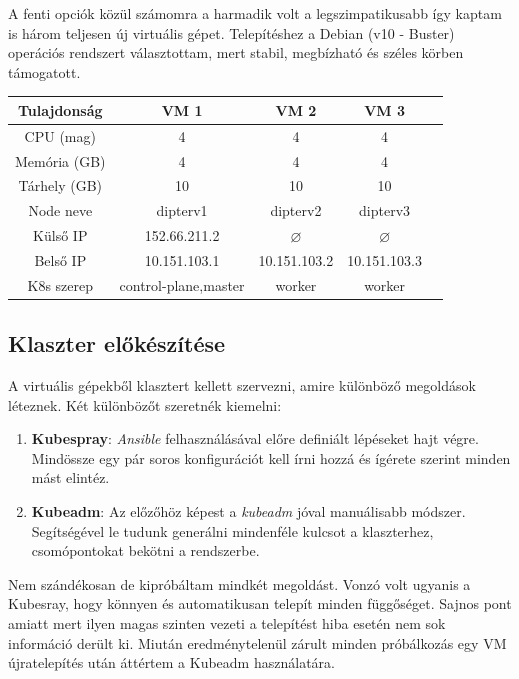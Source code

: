 A fenti opciók közül számomra a harmadik volt a legszimpatikusabb így kaptam is három teljesen új virtuális gépet. Telepítéshez a Debian (v10 - Buster) operációs rendszert választottam, mert stabil, megbízható és széles körben támogatott. 

\begin{center}
\begin{tabular}{ c||cccc| } 
\hline 
Tulajdonság & VM 1 & VM 2 & VM 3 \\
\hline \hline
CPU (mag) & 4 & 4 & 4 \\ 
Memória (GB) & 4 & 4 & 4 \\
Tárhely (GB) & 10 & 10 & 10 \\  
Node neve & dipterv1 & dipterv2 & dipterv3 \\ 
Külső IP & 152.66.211.2 & $\varnothing$ & $\varnothing$ \\ 
Belső IP & 10.151.103.1 & 10.151.103.2 & 10.151.103.3 \\
K8s szerep& control-plane,master & worker & worker \\
\hline
\end{tabular}
\end{center}

\subsection{Klaszter előkészítése}
A virtuális gépekből klasztert kellett szervezni, amire különböző megoldások léteznek.\citep{kubernetesInstall} Két különbözőt szeretnék kiemelni:
\begin{enumerate}
  \item \textbf{Kubespray}: \textit{Ansible} felhasználásával előre definiált lépéseket hajt végre. Mindössze egy pár soros konfigurációt kell írni hozzá és ígérete szerint minden mást elintéz.
  \item \textbf{Kubeadm}: Az előzőhöz képest a \textit{kubeadm} jóval manuálisabb módszer. Segítségével le tudunk generálni mindenféle kulcsot a klaszterhez, csomópontokat bekötni a rendszerbe.
\end{enumerate}

Nem szándékosan de kipróbáltam mindkét megoldást. Vonzó volt ugyanis a Kubesray, hogy könnyen és automatikusan telepít minden függőséget. Sajnos pont amiatt mert ilyen magas szinten vezeti a telepítést hiba esetén nem sok információ derült ki. Miután eredménytelenül zárult minden próbálkozás egy VM újratelepítés után áttértem a Kubeadm használatára. 


